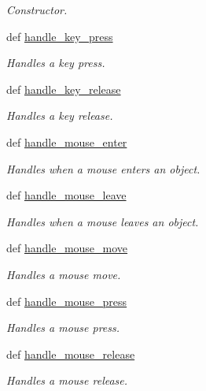 \begin{DoxyCompactItemize}
\begin{DoxyCompactList}\small\item\em Constructor. \item\end{DoxyCompactList}\item 
def \hyperlink{classbroken__cs110graphics_1_1EventHandler_a81f3281ba7b309b800ec5e37fb42b182}{handle\_\-key\_\-press}
\begin{DoxyCompactList}\small\item\em Handles a key press. \item\end{DoxyCompactList}\item 
def \hyperlink{classbroken__cs110graphics_1_1EventHandler_ac9a757b4108de84c85211c05dec7ce46}{handle\_\-key\_\-release}
\begin{DoxyCompactList}\small\item\em Handles a key release. \item\end{DoxyCompactList}\item 
def \hyperlink{classbroken__cs110graphics_1_1EventHandler_a7c78f3d6cfd790f2e04223b84495f39b}{handle\_\-mouse\_\-enter}
\begin{DoxyCompactList}\small\item\em Handles when a mouse enters an object. \item\end{DoxyCompactList}\item 
def \hyperlink{classbroken__cs110graphics_1_1EventHandler_afc741f1f32e1bb4ccc26f8264a49f8eb}{handle\_\-mouse\_\-leave}
\begin{DoxyCompactList}\small\item\em Handles when a mouse leaves an object. \item\end{DoxyCompactList}\item 
def \hyperlink{classbroken__cs110graphics_1_1EventHandler_a4277deafa3c6eb088674f6ae561c0ca7}{handle\_\-mouse\_\-move}
\begin{DoxyCompactList}\small\item\em Handles a mouse move. \item\end{DoxyCompactList}\item 
def \hyperlink{classbroken__cs110graphics_1_1EventHandler_aa1d6a9e7eac44b038c67dbcb5baccec0}{handle\_\-mouse\_\-press}
\begin{DoxyCompactList}\small\item\em Handles a mouse press. \item\end{DoxyCompactList}\item 
def \hyperlink{classbroken__cs110graphics_1_1EventHandler_afcea459e9461ca35ba664d240767b0cc}{handle\_\-mouse\_\-release}
\begin{DoxyCompactList}\small\item\em Handles a mouse release. \item\end{DoxyCompactList}\end{DoxyCompactItemize}


